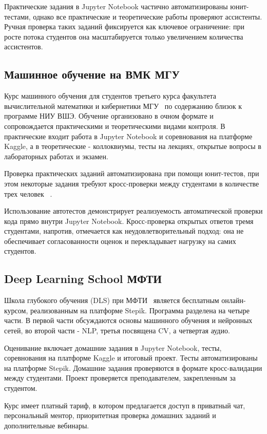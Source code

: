 Практические задания в Jupyter Notebook частично автоматизированы юнит-тестами, однако все практические и теоретические работы проверяют ассистенты. Ручная проверка таких заданий фиксируется как ключевое ограничение: при росте потока студентов она масштабируется только увеличением количества ассистентов.

\subsection{Машинное обучение на ВМК МГУ}

Курс машинного обучения для студентов третьего курса факультета вычислительной математики и кибернетики МГУ~\cite{msu_ml} по содержанию близок к программе НИУ ВШЭ. Обучение организовано в очном формате и сопровождается практическими и теоретическими видами контроля. В практические входит работа в Jupyter Notebook и соревнования на платформе Kaggle, а в теоретические - коллоквиумы, тесты на лекциях, открытые вопросы в лабораторных работах и экзамен.

Проверка практических заданий автоматизирована при помощи юнит-тестов, при этом некоторые задания требуют кросс-проверки между студентами в количестве трех человек ~\cite{msu_ml_grading}.

Использование автотестов демонстрирует реализуемость автоматической проверки кода
прямо внутри Jupyter Notebook. Кросс-проверка открытых ответов тремя студентами, напротив,
отмечается как неудовлетворительный подход: она не обеспечивает
согласованности оценок и перекладывает нагрузку на самих студентов.

\subsection{Deep Learning School МФТИ}

Школа глубокого обучения (DLS) при МФТИ~\cite{dls_mipt} является бесплатным онлайн-курсом, реализованным на платформе Stepik. Программа разделена на четыре части. В первой части обсуждаются основы машинного обучения и нейронных сетей, во второй части - NLP, третья посвящена CV, а четвертая аудио.

Оценивание включает домашние задания в Jupyter Notebook, тесты, соревнования на платформе Kaggle и итоговый проект. Тесты автоматизированы на платформе Stepik. Домашние задания проверяются в формате кросс-валидации между студентами. Проект проверяется преподавателем, закрепленным за студентом.

Курс имеет платный тариф, в котором предлагается доступ в приватный чат, персональный ментор, приоритетная проверка домашних заданий и дополнительные вебинары.

